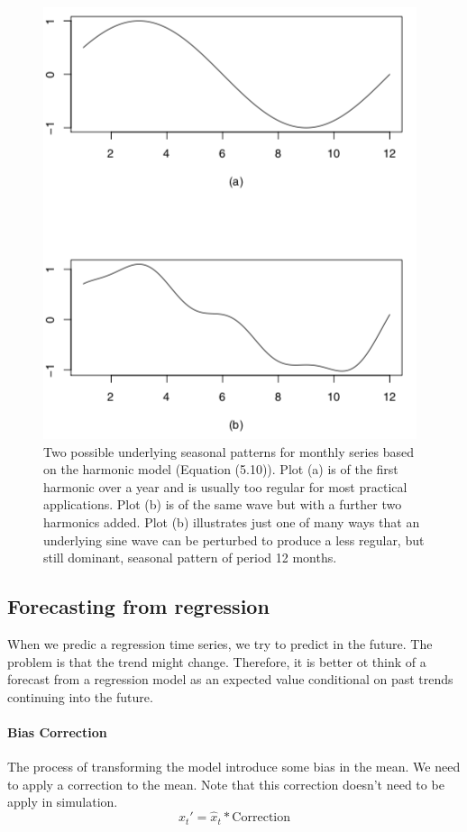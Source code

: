 \begin{figure}[!ht]
    \centering 
    \includegraphics[scale=0.7]{src/SerieChronologique/HarmonicModel.png}
    \caption{Two possible underlying seasonal patterns for monthly series based on the harmonic model (Equation (5.10)). Plot (a) is of the first harmonic over a year and is usually too regular for most practical applications. Plot (b) is of the same wave but with a further two harmonics added. Plot (b) illustrates just one of many ways that an underlying sine wave can be perturbed to produce a less regular, but still dominant, seasonal pattern of period 12 months.}
\end{figure}

\subsection{Forecasting from regression}
When we predic a regression time series, we try to predict in the future. The problem is that the trend might change. Therefore, it is better ot think of a forecast from a regression model as an expected value conditional on past trends continuing into the future.

\paragraph{Bias Correction} 
The process of transforming the model introduce some bias in the mean. We need to apply a correction to the mean. Note that this correction doesn't need to be apply in simulation.
\[ \hat{x}_t' = \hat{x}_t * \text{Correction} \]

